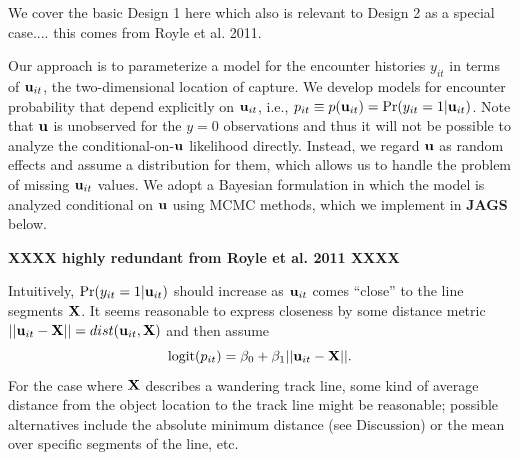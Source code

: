 We cover the basic Design 1 here which also is relevant to Design 2 as
a special case.... this comes from Royle et al. 2011. 

Our approach is to parameterize a model for the encounter histories
$y_{it}$ in terms of ${\bf u}_{it}$, the two-dimensional location of
capture. We develop models for encounter probability that depend
explicitly on ${\bf u}_{it}$, i.e., $p_{it} \equiv p({\bf u}_{it}) =
\Pr(y_{it}=1|{\bf u}_{it})$.  Note that ${\bf u}$ is unobserved for
the $y=0$ observations and thus it will not be possible to analyze the
conditional-on-${\bf u}$ likelihood directly. Instead, we regard ${\bf
  u}$ as random effects and assume a distribution for them, which
allows us to handle the problem of missing ${\bf u}_{it}$ values. We
adopt a Bayesian formulation in which the model is analyzed
conditional on ${\bf u}$ using MCMC methods, which we implement in
{\bf JAGS} below.

{\bf XXXX highly redundant from Royle et al. 2011 XXXX}

Intuitively, $\Pr(y_{it}=1|{\bf u}_{it})$ should increase as ${\bf
  u}_{it}$ comes ``close'' to the line segments ${\bf X}$. It seems
reasonable to express closeness by some distance metric $|| {\bf
  u}_{it} - {\bf X} || = dist( {\bf u}_{it}, {\bf X})$ and then assume
\[
\mbox{logit}(p_{it}) = \beta_{0} + \beta_{1} || {\bf u}_{it} - {\bf X} ||.
\]
For the case where ${\bf X}$ describes a wandering track line, some
kind of average distance from the object location to the track line
might be reasonable; possible alternatives include the absolute
minimum distance (see Discussion) or the mean over specific segments
of the line, etc.

